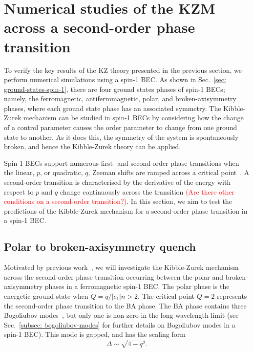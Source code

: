 \section{Numerical studies of the KZM across a second-order phase transition}
To verify the key results of the KZ theory presented in the previous section,
we perform numerical simulations using a spin-1 BEC\@.
As shown in Sec.~\ref{sec: ground-states-spin-1}, there are four ground states
phases of spin-1 BECs; namely, the ferromagnetic, antiferromagnetic, polar, and
broken-axisymmetry phases, where each ground state phase has an associated
symmetry.
The Kibble-Zurek mechanism can be studied in spin-1 BECs by considering how
the change of a control parameter causes the order parameter to change from
one ground state to another.
As it does this, the symmetry of the system is spontaneously broken, and hence
the Kibble-Zurek theory can be applied.

Spin-1 BECs support numerous first- and second-order phase transitions
when the linear, \( p \), or quadratic, \( q \), Zeeman shifts are
ramped across a critical point~\cite{Kawaguchi2012}.
A second-order transition is characterised by the derivative of the energy with
respect to \( p \) and \( q \) change continuously across the transition
\textcolor{red}{(Are there other conditions on a second-order transition?)}.
In this section, we aim to test the predictions of the Kibble-Zurek mechanism
for a second-order phase transition in a spin-1 BEC\@.

\subsection{Polar to broken-axisymmetry quench}\label{sec: KZM-second-order-numerics}
Motivated by previous work~\cite{Damski2007}, we will investigate the
Kibble-Zurek mechanism across the second-order phase transition occurring
between the polar and broken-axisymmetry phases in a ferromagnetic spin-1 BEC\@.
The polar phase is the energetic ground state when \( Q=q/|c_1|n > 2 \).
The critical point \( Q = 2 \) represents the second-order phase transition to
the BA phase.
The BA phase contains three Bogoliubov modes~\cite{Uchino2010}, but only one
is non-zero in the long wavelength limit (see
Sec.~\ref{subsec: bogoliubov-modes} for further details on Bogoliubov modes in
a spin-1 BEC).
This mode is gapped, and has the scaling form
\begin{equation}
    \Delta \sim \sqrt{4 - q^2}.
\end{equation}

